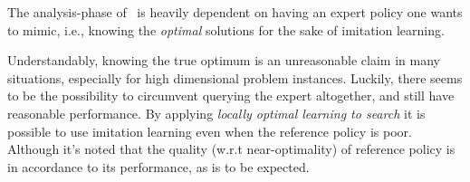 The analysis-phase of \Alice\ is heavily dependent on having an expert 
policy one wants to mimic, i.e., knowing the \emph{optimal} solutions for the 
sake of imitation learning. 

Understandably, knowing the true optimum is an unreasonable claim in many 
situations, especially for high dimensional problem instances. 
Luckily, there seems to be the possibility to circumvent querying the expert 
altogether, and still have reasonable performance. 
By applying \emph{locally optimal learning to search} \citep{ChangKADL15} it is 
possible to use imitation learning even when the reference policy is poor. 
Although it's noted that the quality (w.r.t near-optimality) of reference 
policy is in accordance to its performance, as is to be expected. 

